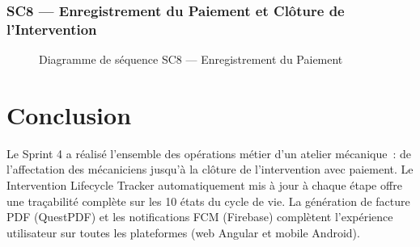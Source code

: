 \documentclass[12pt,a4paper]{report}
\begin{document}
\subsubsection*{SC8 — Enregistrement du Paiement et Clôture de l'Intervention}

\begin{figure}[H]
\centering
{}%
\caption{Diagramme de séquence SC8 — Enregistrement du Paiement}
\label{fig:seq-payment}
\end{figure}

\section{Conclusion}

Le Sprint 4 a réalisé l'ensemble des opérations métier d'un atelier mécanique~:
de l'affectation des mécaniciens jusqu'à la clôture de l'intervention avec paiement.
Le Intervention Lifecycle Tracker automatiquement mis à jour à chaque étape offre
une traçabilité complète sur les 10 états du cycle de vie. La génération de facture
PDF (QuestPDF) et les notifications FCM (Firebase) complètent l'expérience utilisateur
sur toutes les plateformes (web Angular et mobile Android).
\end{document}
